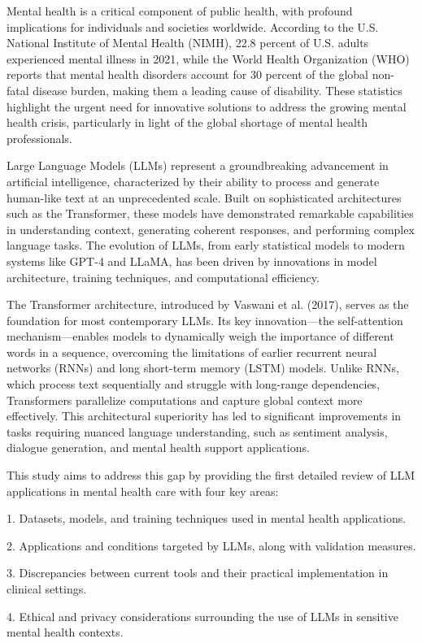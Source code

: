 Mental health is a critical component of public health, with profound implications for individuals and societies worldwide. According to the U.S. National Institute of Mental Health (NIMH), 22.8 percent of U.S. adults experienced mental illness in 2021, while the World Health Organization (WHO) reports that mental health disorders account for 30 percent of the global non-fatal disease burden, making them a leading cause of disability. These statistics highlight the urgent need for innovative solutions to address the growing mental health crisis, particularly in light of the global shortage of mental health professionals.

Large Language Models (LLMs) represent a groundbreaking advancement in artificial intelligence, characterized by their ability to process and generate human-like text at an unprecedented scale. Built on sophisticated architectures such as the Transformer, these models have demonstrated remarkable capabilities in understanding context, generating coherent responses, and performing complex language tasks. The evolution of LLMs, from early statistical models to modern systems like GPT-4 and LLaMA, has been driven by innovations in model architecture, training techniques, and computational efficiency.

The Transformer architecture, introduced by Vaswani et al. (2017), serves as the foundation for most contemporary LLMs. Its key innovation—the self-attention mechanism—enables models to dynamically weigh the importance of different words in a sequence, overcoming the limitations of earlier recurrent neural networks (RNNs) and long short-term memory (LSTM) models. Unlike RNNs, which process text sequentially and struggle with long-range dependencies, Transformers parallelize computations and capture global context more effectively. This architectural superiority has led to significant improvements in tasks requiring nuanced language understanding, such as sentiment analysis, dialogue generation, and mental health support applications.

This study aims to address this gap by providing the first detailed review of LLM applications in mental health care with four key areas:

1. Datasets, models, and training techniques used in mental health applications.

2. Applications and conditions targeted by LLMs, along with validation measures.

3. Discrepancies between current tools and their practical implementation in clinical settings.

4. Ethical and privacy considerations surrounding the use of LLMs in sensitive mental health contexts.